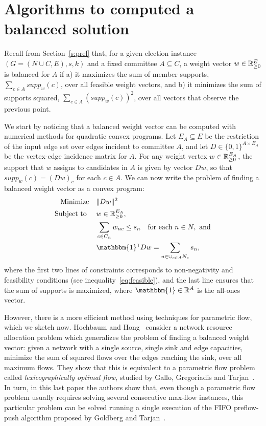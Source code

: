 \section{Algorithms to computed a balanced solution} \label{s:balanced}

Recall from Section~\ref{s:prel} that, for a given election instance $(G = (N \cup C, E), s, k)$ and a fixed committee $A\subseteq C$, a weight vector $w\in \mathbb{R}_{\geq 0}^E$ is balanced for $A$ if a) it maximizes the sum of member supports, $\sum_{c\in A} supp_w(c)$, over all feasible weight vectors, and b) it minimizes the sum of supports squared, $\sum_{c\in A} (supp_w(c))^2$, over all vectors that observe the previous point. 

We start by noticing that a balanced weight vector can be computed with numerical methods for quadratic convex programs. 
Let $E_A\subseteq E$ be the restriction of the input edge set over edges incident to committee $A$, and let $D\in\{0,1\}^{A\times E_A}$ be the vertex-edge incidence matrix for $A$. 
For any weight vertex $w\in\mathbb{R}_{\geq 0}^{E_A}$, the support that $w$ assigns to candidates in $A$ is given by vector $Dw$, so that $supp_w(c)=(Dw)_c$ for each $c\in A$. 
We can now write the problem of finding a balanced weight vector as a convex program:
\begin{align*}
    \text{Minimize} \quad & \|Dw\|^2 \\
    \text{Subject to } \quad & w\in\R^{E_A}, \\
    & \sum_{c\in C_n} w_{nc} \leq s_n \quad \text{for each } n\in N, \text{ and} \\
    & \mathbbm{1}^{\intercal} Dw = \sum_{n\in \cup_{c\in A} N_c} s_n,
\end{align*}
where the first two lines of constraints corresponds to non-negativity and feasibility conditions (see inequality~\ref{eq:feasible}), and the last line ensures that the sum of supports is maximized, where $\mathbbm{1}\in\mathbb{R}^A$ is the all-ones vector. 



However, there is a more efficient method using techniques for parametric flow, which we sketch now. Hochbaum and Hong~\cite[Section 6]{hochbaum1995strongly} consider a network resource allocation problem which generalizes the problem of finding a balanced weight vector: given a network with a single source, single sink and edge capacities, minimize the sum of squared flows over the edges reaching the sink, over all maximum flows. 
They show that this is equivalent to a parametric flow problem called \emph{lexicographically optimal flow}, studied by Gallo, Gregoriadis and Tarjan~\cite{gallo1989fast}. 
In turn, in this last paper the authors show that, even though a parametric flow problem usually requires solving several consecutive max-flow instances, this particular problem can be solved running a single execution of the FIFO preflow-push algorithm proposed by Goldberg and Tarjan~\cite{goldberg1988new}.

